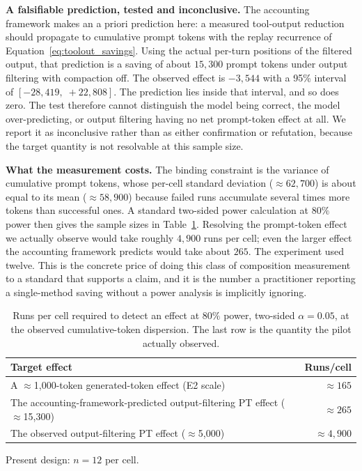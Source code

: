 \documentclass{article}
\begin{document}
\textbf{A falsifiable prediction, tested and inconclusive.} The accounting framework makes an a priori prediction here: a measured tool-output reduction should propagate to cumulative prompt tokens with the replay recurrence of Equation~\eqref{eq:toolout_savings}. Using the actual per-turn positions of the filtered output, that prediction is a saving of about $15{,}300$ prompt tokens under output filtering with compaction off. The observed effect is $-3{,}544$ with a 95\% interval of $[-28{,}419,\;+22{,}808]$. The prediction lies inside that interval, and so does zero. The test therefore cannot distinguish the model being correct, the model over-predicting, or output filtering having no net prompt-token effect at all. We report it as inconclusive rather than as either confirmation or refutation, because the target quantity is not resolvable at this sample size.

\textbf{What the measurement costs.} The binding constraint is the variance of cumulative prompt tokens, whose per-cell standard deviation ($\approx 62{,}700$) is about equal to its mean ($\approx 58{,}900$) because failed runs accumulate several times more tokens than successful ones. A standard two-sided power calculation at $80\%$ power then gives the sample sizes in Table~\ref{tab:power}. Resolving the prompt-token effect we actually observe would take roughly $4{,}900$ runs per cell; even the larger effect the accounting framework predicts would take about $265$. The experiment used twelve. This is the concrete price of doing this class of composition measurement to a standard that supports a claim, and it is the number a practitioner reporting a single-method saving without a power analysis is implicitly ignoring.

\begin{table}[!htbp]
\caption{Runs per cell required to detect an effect at $80\%$ power, two-sided $\alpha=0.05$, at the observed cumulative-token dispersion. The last row is the quantity the pilot actually observed.}
\label{tab:power}
\centering
\footnotesize
\begin{tabularx}{\textwidth}{@{}Xr@{}}
\toprule
Target effect & Runs/cell \\
\midrule
A $\approx$1{,}000-token generated-token effect (E2 scale) & $\approx 165$ \\
The accounting-framework-predicted output-filtering PT effect ($\approx$15{,}300) & $\approx 265$ \\
The observed output-filtering PT effect ($\approx$5{,}000) & $\approx 4{,}900$ \\
\bottomrule
\end{tabularx}
{\footnotesize\raggedright Present design: $n=12$ per cell.\par}
\end{table}
\end{document}
